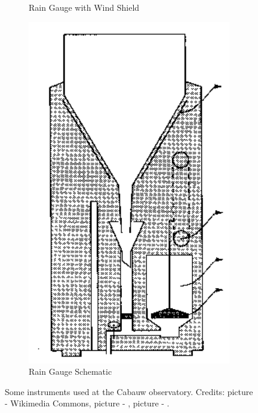 \documentclass[a4paper,11pt]{kth-mag}
\begin{document}
\begin{figure}
\begin{subfigure}[t]{0.28\textwidth}
        \caption{Rain Gauge with Wind Shield}
        \label{fig:rain_gauge_shield}
    \end{subfigure}
    \hfill
    \begin{subfigure}[t]{0.18\textwidth}
        \centering
        \includegraphics[width=\textwidth]{images/rain_gauge}
        \caption{Rain Gauge Schematic}
        \label{fig:rain_gauge_schematic}
    \end{subfigure}
    \caption[Some instruments used at the Cabauw observatory.]{Some instruments used at the Cabauw observatory. Credits: picture  - Wikimedia Commons\protect\footnotemark, picture  - \cite{windsheld_rain}, picture  - \cite{rain}.}
	\label{fig:cabauw_instruments}
\end{figure}
\end{document}
